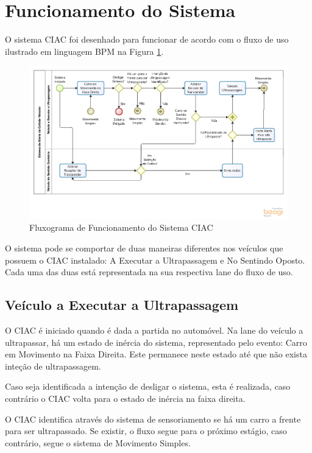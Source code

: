 \section{Funcionamento do Sistema}

O sistema CIAC foi desenhado para funcionar de acordo com o fluxo de uso ilustrado
em linguagem BPM na Figura \ref{fig:funcionamento_sistema}.

\begin{figure}[h]
  \centering
  \includegraphics[width=470px, scale=1]{figuras/funcionamento_sistema}
  \caption{Fluxograma de Funcionamento do Sistema CIAC}
\label{fig:funcionamento_sistema}
\end{figure}

O sistema pode se comportar de duas maneiras diferentes nos veículos que possuem
o CIAC instalado: A Executar a Ultrapassagem e No Sentindo Oposto. Cada uma das duas
está representada na sua respectiva lane do fluxo de uso.

\subsection{Veículo a Executar a Ultrapassagem}
O CIAC é iniciado quando é dada a partida no automóvel. Na lane do veículo a ultrapassar,
há um estado de inércia do sistema, representado pelo evento: Carro em Movimento
na Faixa Direita. Este permanece neste estado até que não exista inteção de
ultrapassagem.

Caso seja identificada a intenção de desligar o sistema, esta é realizada, caso
contrário o CIAC volta para o estado de inércia na faixa direita.

O CIAC identifica através do sistema de sensoriamento se há um carro a frente
para ser ultrapassado. Se existir, o fluxo segue para o próximo estágio, caso
contrário, segue o sistema de Movimento Simples.

